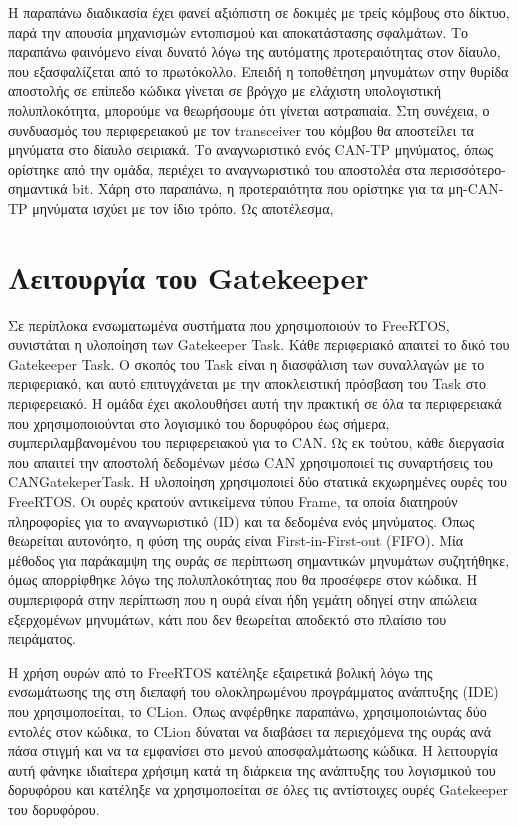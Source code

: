 \documentclass[a4paper,nobib,justified]{tufte-book}
\begin{document}
Η παραπάνω διαδικασία έχει φανεί αξιόπιστη σε δοκιμές με τρείς κόμβους στο δίκτυο, παρά την απουσία μηχανισμών εντοπισμού και αποκατάστασης σφαλμάτων. Το παραπάνω φαινόμενο είναι δυνατό λόγω της αυτόματης προτεραιότητας στον δίαυλο, που εξασφαλίζεται από το πρωτόκολλο. Επειδή η τοποθέτηση μηνυμάτων στην θυρίδα αποστολής σε επίπεδο κώδικα γίνεται σε βρόγχο με ελάχιστη υπολογιστική πολυπλοκότητα, μπορούμε να θεωρήσουμε ότι γίνεται αστραπιαία. Στη συνέχεια, ο συνδυασμός του περιφερειακού με τον transceiver του κόμβου θα αποστείλει τα μηνύματα στο δίαυλο σειριακά. Το αναγνωριστικό ενός CAN-TP μηνύματος, όπως ορίστηκε από την ομάδα, περιέχει το αναγνωριστικό του αποστολέα στα περισσότερο-σημαντικά bit. Χάρη στο παραπάνω, η προτεραιότητα που ορίστηκε για τα μη-CAN-TP μηνύματα ισχύει με τον ίδιο τρόπο. Ως αποτέλεσμα, 

\section{Λειτουργία του Gatekeeper}
\label{gatekeeper}

Σε περίπλοκα ενσωματωμένα συστήματα που χρησιμοποιούν το FreeRTOS, συνιστάται η υλοποίηση των Gatekeeper Task. Κάθε περιφεριακό απαιτεί το δικό του Gatekeeper Task. Ο σκοπός του Task είναι η διασφάλιση των συναλλαγών με το περιφεριακό, και αυτό επιτυγχάνεται με την αποκλειστική πρόσβαση του Task στο περιφερειακό. Η ομάδα έχει ακολουθήσει αυτή την πρακτική σε όλα τα περιφερειακά που χρησιμοποιούνται στο λογισμικό του δορυφόρου έως σήμερα, συμπεριλαμβανομένου του περιφερειακού για το CAN. Ως εκ τούτου, κάθε διεργασία που απαιτεί την αποστολή δεδομένων μέσω CAN χρησιμοποιεί τις συναρτήσεις του CANGatekeperTask. Η υλοποίηση χρησιμοποιεί δύο στατικά εκχωρημένες ουρές του FreeRTOS. Οι ουρές κρατούν αντικείμενα τύπου Frame, τα οποία διατηρούν πληροφορίες για το αναγνωριστικό (ID) και τα δεδομένα ενός μηνύματος. Όπως θεωρείται αυτονόητο, η φύση της ουράς είναι First-in-First-out (FIFO). Μία μέθοδος για παράκαμψη της ουράς σε περίπτωση σημαντικών μηνυμάτων συζητήθηκε, όμως απορρίφθηκε λόγω της πολυπλοκότητας που θα προσέφερε στον κώδικα. Η συμπεριφορά στην περίπτωση που η ουρά είναι ήδη γεμάτη οδηγεί στην απώλεια εξερχομένων μηνυμάτων, κάτι που δεν θεωρείται αποδεκτό στο πλαίσιο του πειράματος.

\par Η χρήση ουρών από το FreeRTOS κατέληξε εξαιρετικά βολική λόγω της ενσωμάτωσης της στη διεπαφή του ολοκληρωμένου προγράμματος ανάπτυξης (IDE) που χρησιμοποείται, το CLion. Όπως ανφέρθηκε παραπάνω, χρησιμοποιώντας δύο εντολές στον κώδικα, το CLion δύναται να διαβάσει τα περιεχόμενα της ουράς ανά πάσα στιγμή και να τα εμφανίσει στο μενού αποσφαλμάτωσης κώδικα. Η λειτουργία αυτή φάνηκε ιδιαίτερα χρήσιμη κατά τη διάρκεια της ανάπτυξης του λογισμικού του δορυφόρου και κατέληξε να χρησιμοποείται σε όλες τις αντίστοιχες ουρές Gatekeeper του δορυφόρου.
\end{document}
